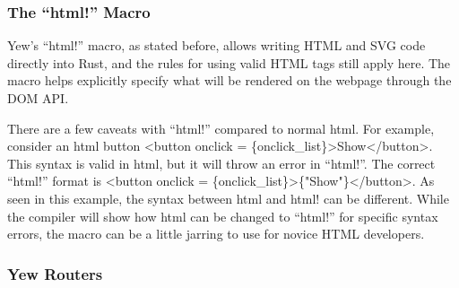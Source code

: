 \documentclass[
    paper=letter,
    parskip=half,
    fontsize=12pt,
    titlepage=firstiscover,
    toc=bibliography,
    numbers=endperiod
]{scrartcl}
\begin{document}
\subsubsection{The ``html!'' Macro}
\label{subsec:html-macro}

Yew's ``html!'' macro, as stated before, allows writing HTML and SVG
code directly into Rust, and the rules for using valid HTML tags still
apply here. The macro helps explicitly specify what will be rendered on
the webpage through the DOM API.

There are a few caveats with ``html!'' compared to normal html. For
example, consider an html button \textless button onclick =
\{onclick\_list\}\textgreater Show\textless/button\textgreater. This
syntax is valid in html, but it will throw an error in ``html!''. The
correct ``html!'' format is \textless button onclick =
\{onclick\_list\}\textgreater\{"Show"\}\textless/button\textgreater. As
seen in this example, the syntax between html and html! can be
different. While the compiler will show how html can be changed to
``html!'' for specific syntax errors, the macro can be a little jarring
to use for novice HTML developers.

\subsubsection{Yew Routers}
\end{document}
